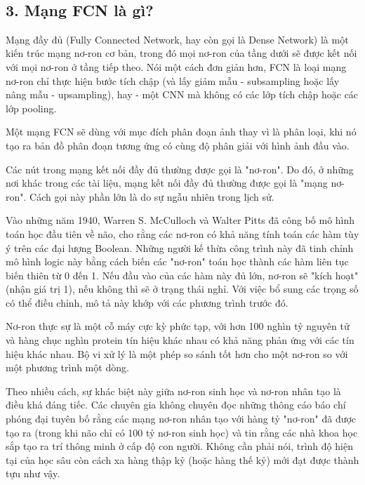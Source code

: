 \documentclass[../main.tex]{subfiles}
\begin{document}
\
\\[-20pt]
\subsection*{3. Mạng FCN là gì?}

Mạng đầy đủ (Fully Connected Network, hay còn gọi là Dense Network) là một kiến trúc mạng nơ-ron cơ bản, trong đó mọi nơ-ron của tầng dưới sẽ được kết nối với mọi nơ-ron ở tầng tiếp theo. Nói một cách đơn giản hơn, FCN là loại mạng nơ-ron chỉ thực hiện bước tích chập (và lấy giảm mẫu - subsampling hoặc lấy nâng mẫu -  upsampling), hay - một CNN mà không có các lớp tích chập hoặc các lớp pooling.

Một mạng FCN sẽ dùng với mục đích phân đoạn ảnh thay vì là phân loại, khi nó tạo ra bản đồ phân đoạn tương ứng có cùng độ phân giải với hình ảnh đầu vào.

Các nút trong mạng kết nối đầy đủ thường được gọi là "nơ-ron". Do đó, ở những nơi khác trong các tài liệu, mạng kết nối đầy đủ thường được gọi là "mạng nơ-ron". Cách gọi này phần lớn là do sự ngẫu nhiên trong lịch sử.

Vào những năm 1940, Warren S. McCulloch và Walter Pitts đã công bố mô hình toán học đầu tiên về não, cho rằng các nơ-ron có khả năng tính toán các hàm tùy ý trên các đại lượng Boolean. Những người kế thừa công trình này đã tinh chỉnh mô hình logic này bằng cách biến các "nơ-ron" toán học thành các hàm liên tục biến thiên từ 0 đến 1. Nếu đầu vào của các hàm này đủ lớn, nơ-ron sẽ "kích hoạt" (nhận giá trị 1), nếu không thì sẽ ở trạng thái nghỉ. Với việc bổ sung các trọng số có thể điều chỉnh, mô tả này khớp với các phương trình trước đó.

Nơ-ron thực sự là một cỗ máy cực kỳ phức tạp, với hơn 100 nghìn tỷ nguyên tử và hàng chục nghìn protein tín hiệu khác nhau có khả năng phản ứng với các tín hiệu khác nhau. Bộ vi xử lý là một phép so sánh tốt hơn cho một nơ-ron so với một phương trình một dòng.

Theo nhiều cách, sự khác biệt này giữa nơ-ron sinh học và nơ-ron nhân tạo là điều khá đáng tiếc. Các chuyên gia không chuyên đọc những thông cáo báo chí phóng đại tuyên bố rằng các mạng nơ-ron nhân tạo với hàng tỷ "nơ-ron" đã được tạo ra (trong khi não chỉ có 100 tỷ nơ-ron sinh học) và tin rằng các nhà khoa học sắp tạo ra trí thông minh ở cấp độ con người. Không cần phải nói, trình độ hiện tại của học sâu còn cách xa hàng thập kỷ (hoặc hàng thế kỷ) mới đạt được thành tựu như vậy.
\end{document}
